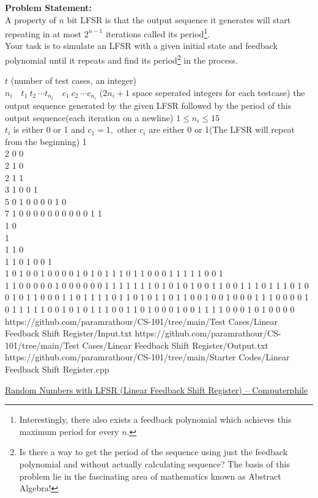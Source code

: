 \documentclass[../../Problems]{subfiles}
\begin{document}
\vspace{-2em}
\textbf{Problem Statement:}\\
A property of $n$ bit LFSR is that the output sequence it generates will start repeating in at most $2^{n-1}$ iterations called its period\footnote{Interestingly, there also exists a feedback polynomial which achieves this maximum period for every $n$.}.\\
Your task is to simulate an LFSR with a given initial state and feedback polynomial until it repeats and find its period\footnote{Is there a way to get the period of the sequence using just the feedback polynomial and without actually calculating sequence? The basis of this problem lie in the fascinating area of mathematics known as Abstract Algebra!
} in the process.
\begin{testcasesMore}
	{$t$ \hfill(number of test cases, an integer)\\
	$n_i\quad t_1\ t_2\ \cdots t_{n_i}\quad c_1\ c_2\ \cdots c_{n_i}$ \hfill($2n_i+1$ space seperated integers for each testcase)}
	{the output sequence generated by the given LFSR followed by the period of this output sequence\hfill(each iteration on a newline)}
	{$1 \leq n_i \leq 15$\\
	$t_i$ is either 0 or 1 and $c_1 = 1$\footnotemark,\ other $c_i$ are either 0 or 1\hfill(The LFSR will repeat from the beginning)}
	{1  \\2  0 0\\2  1  0\\2  1  1\\3  1 0  0 1\\5  0 1 0 0  0 0 1 0\\7  1 0 0 0 0 0  0 0 0 0 0 1}
	{1\\1 0\\1\\1 1 0\\1 1 0 1 0 0 1\\1 0 1 0 0 1 0 0 0 0 1 0 1 0 1 1 1 0 1 1 0 0 0 1 1 1 1 1 0 0 1\\1 1 0 0 0 0 0 1 0 0 0 0 0 0 1 1 1 1 1 1 1 0 1 0 1 0 1 0 0 1 1 0 0 1 1 1 0 1 1 1 0 1 0 0 1 0 1 1 0 0 0 1 1 0 1 1 1 1 0 1 1 0 1 0 1 1 0 1 1 0 0 1 0 0 1 0 0 0 1 1 1 0 0 0 0 1 0 1 1 1 1 1 0 0 1 0 1 0 1 1 1 0 0 1 1 0 1 0 0 0 1 0 0 1 1 1 1 0 0 0 1 0 1 0 0 0 0}
	{https://github.com/paramrathour/CS-101/tree/main/Test Cases/Linear Feedback Shift Register/Input.txt}
	{https://github.com/paramrathour/CS-101/tree/main/Test Cases/Linear Feedback Shift Register/Output.txt}
	{https://github.com/paramrathour/CS-101/tree/main/Starter Codes/Linear Feedback Shift Register.cpp}
\end{testcasesMore}
\begin{funvideo}
	\href{https://youtu.be/Ks1pw1X22y4}{Random Numbers with LFSR (Linear Feedback Shift Register) -- Computerphile}
\end{funvideo}
\recalctypearea
\end{document}
